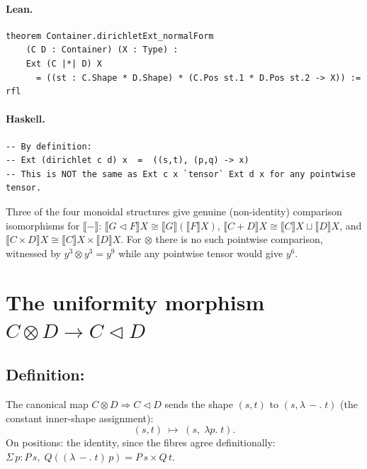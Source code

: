 \documentclass[11pt,a4paper]{article}
\begin{document}
\paragraph{Lean.}
\begin{lstlisting}[style=lean]
theorem Container.dirichletExt_normalForm
    (C D : Container) (X : Type) :
    Ext (C |*| D) X
      = ((st : C.Shape * D.Shape) * (C.Pos st.1 * D.Pos st.2 -> X)) := rfl
\end{lstlisting}

\paragraph{Haskell.}
\begin{lstlisting}[style=haskell]
-- By definition:
-- Ext (dirichlet c d) x  =  ((s,t), (p,q) -> x)
-- This is NOT the same as Ext c x `tensor` Ext d x for any pointwise tensor.
\end{lstlisting}

\begin{fidelitynote}
Three of the four monoidal structures give genuine (non-identity) comparison
isomorphisms for $\llbracket{-}\rrbracket$: $\llbracket G \triangleleft F
\rrbracket X \cong \llbracket G \rrbracket (\llbracket F \rrbracket X)$,
$\llbracket C + D \rrbracket X \cong \llbracket C \rrbracket X \sqcup
\llbracket D \rrbracket X$, and $\llbracket C \times D \rrbracket X \cong
\llbracket C \rrbracket X \times \llbracket D \rrbracket X$.  For $\otimes$
there is no such pointwise comparison, witnessed by $y^3 \otimes y^3 = y^9$
while any pointwise tensor would give $y^6$.
\end{fidelitynote}


\section{The uniformity morphism \texorpdfstring{$C \otimes D \to C \triangleleft D$}{C tensor D -> C seq D}}

\subsection{Definition: }

\begin{defn}
The canonical map $C \otimes D \Rightarrow C \triangleleft D$ sends the shape
$(s, t)$ to $(s, \lambda\,{-}.\;t)$ (the constant inner-shape assignment):
\[
  (s, t) \;\longmapsto\; (s,\; \lambda p.\; t).
\]
On positions: the identity, since the fibres agree definitionally:
$\Sigma\,p : P\,s,\; Q((\lambda\,{-}.\;t)\,p) = P\,s \times Q\,t$.
\end{defn}
\end{document}

